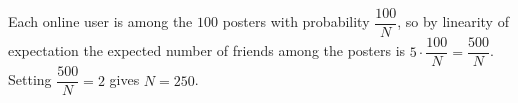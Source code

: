 Each online user is among the $100$ posters with probability $\dfrac{100}N$, so by linearity of expectation the expected number of friends among the posters is $5\cdot\dfrac{100}{N}=\dfrac{500}N$. Setting $\dfrac{500}N=2$ gives $N=\boxed{250}$.
